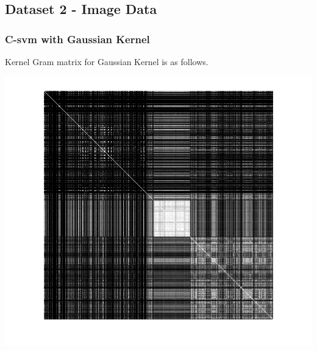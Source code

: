\documentclass{article}
\begin{document}
\subsection{Dataset 2 - Image Data}
\subsubsection{C-svm with Gaussian Kernel}
Kernel Gram matrix for Gaussian Kernel is as follows.
\begin{center}
\includegraphics[scale=1]{Classification/2/c_g/kgm}
\end{center}
\end{document}
